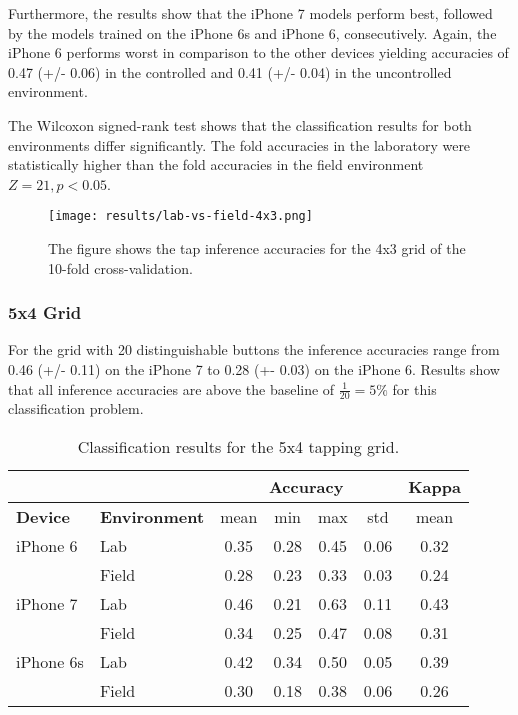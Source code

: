 Furthermore, the results show that the iPhone 7 models perform best, followed by the models trained on the iPhone 6s and iPhone 6, consecutively. Again, the iPhone 6 performs worst in comparison to the other devices yielding accuracies of 0.47 (+/- 0.06) in the controlled and 0.41 (+/- 0.04) in the uncontrolled environment. 

The Wilcoxon signed-rank test shows that the classification results for both environments differ significantly. The fold accuracies in the laboratory were statistically higher than the fold accuracies in the field environment $Z = 21, p < 0.05$.

\begin{figure}[h!]
  \centering
  \texttt{[image: results/lab-vs-field-4x3.png]}
  \caption{The figure shows the tap inference accuracies for the 4x3 grid of the 10-fold cross-validation.} \label{fig:participation}
\end{figure}

\subsubsection{5x4 Grid}
For the grid with 20 distinguishable buttons the inference accuracies range from 0.46 (+/- 0.11) on the iPhone 7 to 0.28 (+- 0.03) on the iPhone 6. Results show that all inference accuracies are above the baseline of $\frac{1}{20} = 5\%$ for this classification problem.

\begin{table}[h!]
  \centering
\begin{tabular}{|l|l|c|c|c|c|c|}
  \cline{3-7}
  \multicolumn{2}{c}{} & \multicolumn{4}{|c|}{\textbf{Accuracy}} & \textbf{Kappa} \\
  \hline
  \textbf{Device} & \textbf{Environment} & mean &   min &   max  & std &  mean \\
  \hline
  iPhone 6 & Lab &      0.35 &     0.28 &     0.45 &     0.06 &        0.32 \\
  & Field &      0.28 &     0.23 &     0.33 &     0.03 &        0.24 \\
  \hline
iPhone 7 & Lab &      0.46 &     0.21 &     0.63 &     0.11 &        0.43 \\
  & Field &      0.34 &     0.25 &     0.47 &     0.08 &        0.31 \\
  \hline
iPhone 6s & Lab &      0.42 &     0.34 &     0.50 &     0.05 &        0.39 \\
  & Field &      0.30 &     0.18 &     0.38 &     0.06 &        0.26 \\
  \hline
\end{tabular}
  \caption{Classification results for the 5x4 tapping grid.}
\end{table}

